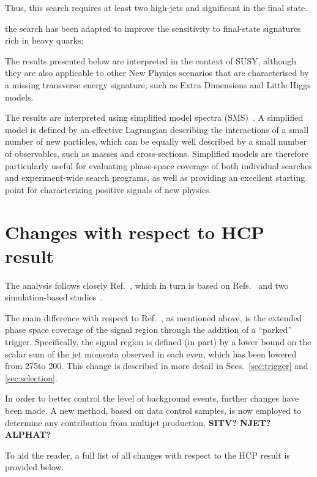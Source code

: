 Thus, this search requires at least two high-\pt jets and significant
\met in the final state. 

the search has been adapted to
 improve the sensitivity to final-state signatures rich in heavy
 quarks; 

The results presented below are interpreted
in the context of SUSY, although they are also applicable to other New
Physics scenarios that are characterised by a missing transverse
energy signature, such as Extra Dimensions and Little Higgs models. 

The results are interpreted using simplified model spectra
(SMS)~\cite{Alwall:2008ag,Alwall:2008va,sms}. A simplified model is
defined by an effective Lagrangian describing the interactions of a
small number of new particles, which can be equally well described by
a small number of observables, such as masses and cross-sections.
Simplified models are therefore particularly useful for evaluating
phase-space coverage of both individual searches and experiment-wide
search programs, as well as providing an excellent starting point for
characterizing positive signals of new physics.

\section{Changes with respect to HCP result\label{sec:changes}}

The analysis follows closely Ref.~\cite{RA1Paper2012}, which in turn
is based on Refs.~\cite{RA1Paper2011FULL, RA1Paper2011, RA1Paper} and
two simulation-based studies~\cite{cms-pas-sus-09001,
  cms-pas-sus-08005}. 

The main difference with respect to Ref.~\cite{RA1Paper2012}, as
mentioned above, is the extended phase space coverage of the signal
region through the addition of a ``parked'' trigger. Specifically, the
signal region is defined (in part) by a lower bound on the scalar sum
of the jet momenta observed in each even, which has been lowered from
275\gev to 200\gev. This change is described in more detail in
Secs.~\ref{sec:trigger} and \ref{sec:selection}.

In order to better control the level of background events, further
changes have been made. A new method, based on data control samples,
is now employed to determine any contribution from multijet
production. {\bf SITV? NJET? ALPHAT?}

To aid the reader, a full list of all changes with respect to the HCP
result is provided below.

